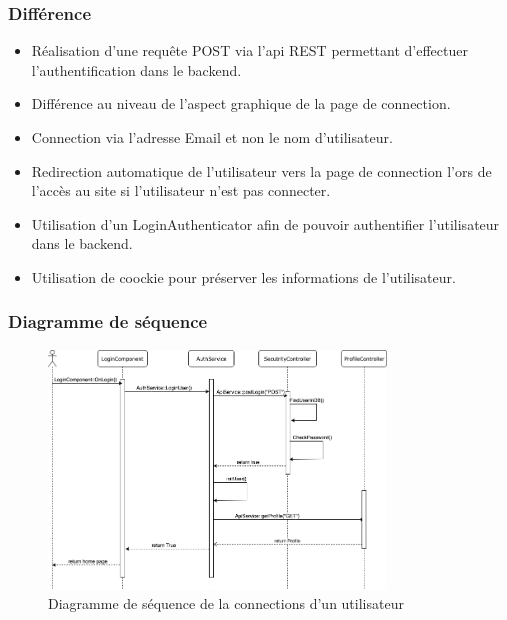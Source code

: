 \subsubsection{Différence}
	\begin{itemize}
		\item Réalisation d'une requête POST via l'api REST permettant d'effectuer l'authentification dans le backend. 
		\item Différence au niveau de l'aspect graphique de la page de connection. 
		\item Connection via l'adresse Email et non le nom d'utilisateur. 
		\item Redirection automatique de l'utilisateur vers la page de connection l'ors de l'accès au site si l'utilisateur n'est pas connecter.
		\item Utilisation d'un LoginAuthenticator afin de pouvoir authentifier l'utilisateur dans le backend. 
		\item Utilisation de coockie pour préserver les informations de l'utilisateur. 
	\end{itemize}
		
\subsubsection{Diagramme de séquence}
	\begin{figure}[h!]
		\includegraphics[width = 0.8\textwidth,center]{Diagramme/sequence-us0-angular}
		\caption{Diagramme de séquence de la connections d'un utilisateur}
	\end{figure}

\newpage
